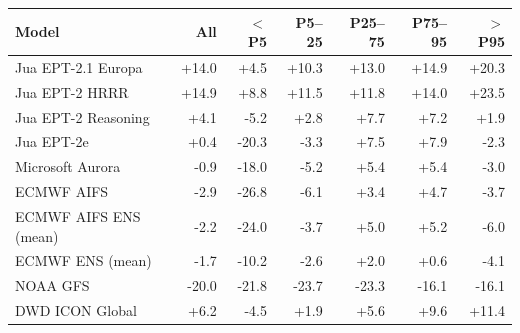 \begin{tabular}{lrrrrrr}
\toprule
Model & All & $<$P5 & P5--25 & P25--75 & P75--95 & $>$P95 \\
\midrule
Jua EPT-2.1 Europa & +14.0 & +4.5 & +10.3 & +13.0 & +14.9 & +20.3 \\
Jua EPT-2 HRRR & +14.9 & +8.8 & +11.5 & +11.8 & +14.0 & +23.5 \\
Jua EPT-2 Reasoning & +4.1 & -5.2 & +2.8 & +7.7 & +7.2 & +1.9 \\
Jua EPT-2e & +0.4 & -20.3 & -3.3 & +7.5 & +7.9 & -2.3 \\
Microsoft Aurora & -0.9 & -18.0 & -5.2 & +5.4 & +5.4 & -3.0 \\
ECMWF AIFS & -2.9 & -26.8 & -6.1 & +3.4 & +4.7 & -3.7 \\
ECMWF AIFS ENS (mean) & -2.2 & -24.0 & -3.7 & +5.0 & +5.2 & -6.0 \\
ECMWF ENS (mean) & -1.7 & -10.2 & -2.6 & +2.0 & +0.6 & -4.1 \\
NOAA GFS & -20.0 & -21.8 & -23.7 & -23.3 & -16.1 & -16.1 \\
DWD ICON Global & +6.2 & -4.5 & +1.9 & +5.6 & +9.6 & +11.4 \\
\bottomrule
\end{tabular}
